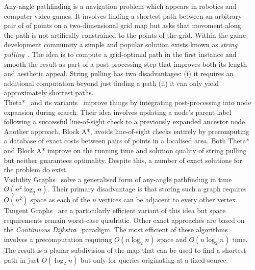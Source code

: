 Any-angle pathfinding is a navigation problem which appears in robotics
and computer video games. It involves finding a shortest path between an 
arbitrary pair of of points on a two-dimensional grid map but asks that 
movoment along the path is not artifically constrained to the points of 
the grid.  Within the game development community a simple and popular 
solution exists known as \emph{string pulling}~\cite{pinter01,botea04}.
The idea is to compute a grid-optimal path in the first
instance and smooth the result as part of a post-processing step that improves
both its length and aesthetic appeal. String pulling has two disadvantages: 
(i) it requires an additional computation beyond just finding a path (ii)
it can only yield approximately shortest paths.
\\
Theta*~\cite{nash07} and its variants~\cite{nash09,nash10} improve things 
by integrating post-processing into node expansion during search. Their 
idea involves updating a node's parent label following a successful line-of-sight
check to a previously expanded ancestor node.
Another approach, Block A*\cite{yap11}, avoids line-of-sight checks entirely 
by precomputing a database of exact costs between pairs of points in a localised area.
Both Theta* and Block A* improve on the running time and 
solution quality of string pulling but neither guarantees optimality.
Despite this, a number of exact solutions for the problem do exist.
\\
Visibility Graphs~\cite{lozanoperez79} solve a generalised form of 
any-angle pathfinding in time $O(n^2\log_{2}n)$. Their primary disadvantage
is that storing such a graph requires $O(n^2)$ space as each of the $n$ 
vertices can be adjacent to every other vertex.  
Tangent Graphs~\cite{liu92} are a particularly efficient 
variant of this idea but space requirements remain worst-case quadratic. 
Other exact approaches are based on the 
\textit{Continuous Dijkstra}~\cite{mitchell87} paradigm.
The most efficient of these algorithms~\cite{hershberger99} involves a
precomputation requiring $O(n \log_{2}{n})$ space and $O(n\log_{2}n)$ time.  The result 
is a planar subdivision of the map that can be used to find a shortest path in 
just $O(\log_{2}n)$ but only for queries originating at a fixed source.
\\
